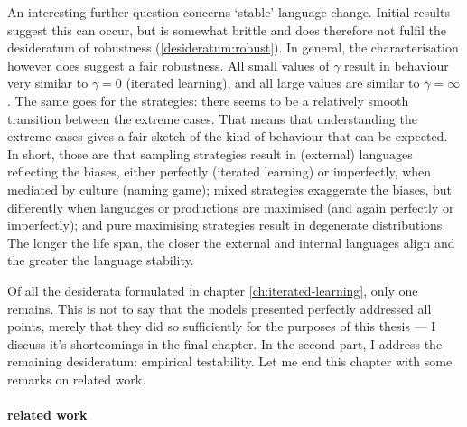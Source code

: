 \documentclass{../src/bcthesispart}
\begin{document}
An interesting further question concerns ‘stable’ language change. 
Initial results suggest this can occur, but is somewhat brittle and does therefore not fulfil the desideratum of robustness (\ref{desideratum:robust}).
In general, the characterisation however does suggest a fair robustness.
All small values of $\gamma$ result in behaviour very similar to $\gamma=0$ (iterated learning), and all large values are similar to $\gamma=\infty$.
The same goes for the strategies: there seems to be a relatively smooth transition between the extreme cases.
That means that understanding the extreme cases gives a fair sketch of the kind of behaviour that can be expected.
In short, those are that sampling strategies result in (external) languages reflecting the biases, either perfectly (iterated learning) or imperfectly, when mediated by culture (naming game); 
mixed strategies exaggerate the biases, but differently when languages or productions are maximised (and again perfectly or imperfectly);
and pure maximising strategies result in degenerate distributions.
The longer the life span, the closer the external and internal languages align and the greater the language stability.




Of all the desiderata formulated in chapter \ref{ch:iterated-learning}, only one remains.
This is not to say that the models presented perfectly addressed all points, merely that they did so sufficiently for the purposes of this thesis — I discuss it’s shortcomings in the final chapter.
In the second part, I address the remaining desideratum: empirical testability.
Let me end this chapter with some remarks on related work.






\paragraph{related work}
\end{document}
